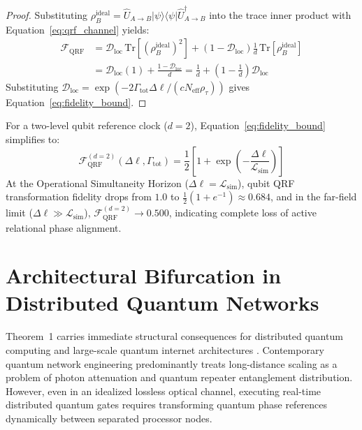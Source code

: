 \documentclass[11pt,a4paper]{article}
\begin{document}
\begin{proof}
Substituting $\rho_B^{\mathrm{ideal}} = \hat{U}_{A \to B} |\psi\rangle\langle\psi| \hat{U}_{A \to B}^\dagger$ into the trace inner product with Equation~\eqref{eq:qrf_channel} yields:
\begin{align*}
    \mathcal{F}_{\mathrm{QRF}} &= \mathcal{D}_{\mathrm{loc}} \, \mathrm{Tr}\!\left[\left(\rho_B^{\mathrm{ideal}}\right)^2\right] + \left(1 - \mathcal{D}_{\mathrm{loc}}\right) \frac{1}{d} \, \mathrm{Tr}\!\left[\rho_B^{\mathrm{ideal}}\right] \\
    &= \mathcal{D}_{\mathrm{loc}} (1) + \frac{1 - \mathcal{D}_{\mathrm{loc}}}{d} = \frac{1}{d} + \left(1 - \frac{1}{d}\right) \mathcal{D}_{\mathrm{loc}}
\end{align*}
Substituting $\mathcal{D}_{\mathrm{loc}} = \exp(-2 \Gamma_{\mathrm{tot}} \Delta\ell / (c N_{\mathrm{eff}} \rho_\tau))$ gives Equation~\eqref{eq:fidelity_bound}.
\end{proof}

For a two-level qubit reference clock ($d = 2$), Equation~\eqref{eq:fidelity_bound} simplifies to:
\begin{equation}
    \mathcal{F}_{\mathrm{QRF}}^{(d=2)}(\Delta\ell, \Gamma_{\mathrm{tot}}) = \frac{1}{2}\left[1 + \exp\left(-\frac{\Delta\ell}{\mathcal{L}_{\mathrm{sim}}}\right)\right]
    \label{eq:qubit_fidelity}
\end{equation}
At the Operational Simultaneity Horizon ($\Delta\ell = \mathcal{L}_{\mathrm{sim}}$), qubit QRF transformation fidelity drops from $1.0$ to $\frac{1}{2}(1 + e^{-1}) \approx 0.684$, and in the far-field limit ($\Delta\ell \gg \mathcal{L}_{\mathrm{sim}}$), $\mathcal{F}_{\mathrm{QRF}}^{(d=2)} \to 0.500$, indicating complete loss of active relational phase alignment.

\section{Architectural Bifurcation in Distributed Quantum Networks}

Theorem~1 carries immediate structural consequences for distributed quantum computing and large-scale quantum internet architectures \cite{kimble2008,wehner2018}. Contemporary quantum network engineering predominantly treats long-distance scaling as a problem of photon attenuation and quantum repeater entanglement distribution. However, even in an idealized lossless optical channel, executing real-time distributed quantum gates requires transforming quantum phase references dynamically between separated processor nodes.
\end{document}
